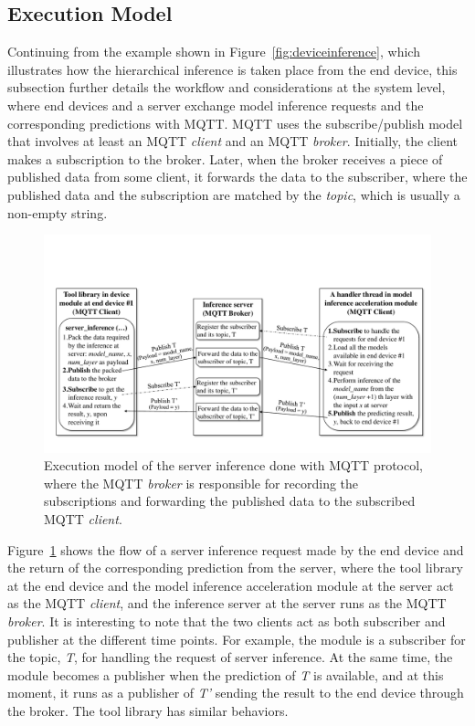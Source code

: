 \documentclass[format=acmsmall, review=false, screen=true]{acmart}
\def\figurename{Figure}
\begin{document}
\subsection{Execution Model}
\label{sec:execmodel}
Continuing from the example shown in \figurename~\ref{fig:deviceinference}, which illustrates how the hierarchical inference is taken place from the end device, this subsection further details the workflow and considerations at the system level, where end devices and a server exchange model inference requests and the corresponding predictions with MQTT. MQTT uses the subscribe/publish model that involves at least an MQTT \emph{client} and an MQTT \emph{broker}. Initially, the client makes a subscription to the broker. Later, when the broker receives a piece of published data from some client, it forwards the data to the subscriber, where the published data and the subscription are matched by the \emph{topic}, which is usually a non-empty string.

	\begin{figure}[htb!]
        \centering
        \includegraphics[width=.88\columnwidth]{figure/exe_model}
        \caption{Execution model of the server inference done with MQTT protocol, where the MQTT \emph{broker} is responsible for recording the subscriptions and forwarding the published data to the subscribed MQTT \emph{client}.}
        \label{fig:exemodel} %
    \end{figure}

\figurename~\ref{fig:exemodel} shows the flow of a server inference request made by the end device and the return of the corresponding prediction from the server, where the tool library at the end device and the model inference acceleration module at the server act as the MQTT \emph{client}, and the inference server at the server runs as the MQTT \emph{broker}. It is interesting to note that the two clients act as both subscriber and publisher at the different time points. For example, the module is a subscriber for the topic, \emph{T}, for handling the request of server inference. At the same time, the module becomes a publisher when the prediction of \emph{T} is available, and at this moment, it runs as a publisher of \emph{T'} sending the result to the end device through the broker. The tool library has similar behaviors.
\end{document}
